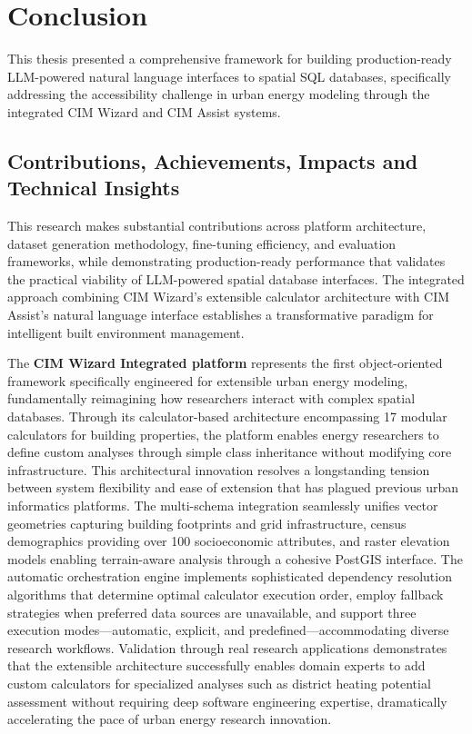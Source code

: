 \chapter{Conclusion}
\label{ch:conclusion}

This thesis presented a comprehensive framework for building production-ready LLM-powered natural language interfaces to spatial SQL databases, specifically addressing the accessibility challenge in urban energy modeling through the integrated CIM Wizard and CIM Assist systems.

\section{Contributions, Achievements, Impacts and Technical Insights}

This research makes substantial contributions across platform architecture, dataset generation methodology, fine-tuning efficiency, and evaluation frameworks, while demonstrating production-ready performance that validates the practical viability of LLM-powered spatial database interfaces. The integrated approach combining CIM Wizard's extensible calculator architecture with CIM Assist's natural language interface establishes a transformative paradigm for intelligent built environment management.

The \textbf{CIM Wizard Integrated platform} represents the first object-oriented framework specifically engineered for extensible urban energy modeling, fundamentally reimagining how researchers interact with complex spatial databases. Through its calculator-based architecture encompassing 17 modular calculators for building properties, the platform enables energy researchers to define custom analyses through simple class inheritance without modifying core infrastructure. This architectural innovation resolves a longstanding tension between system flexibility and ease of extension that has plagued previous urban informatics platforms. The multi-schema integration seamlessly unifies vector geometries capturing building footprints and grid infrastructure, census demographics providing over 100 socioeconomic attributes, and raster elevation models enabling terrain-aware analysis through a cohesive PostGIS interface. The automatic orchestration engine implements sophisticated dependency resolution algorithms that determine optimal calculator execution order, employ fallback strategies when preferred data sources are unavailable, and support three execution modes---automatic, explicit, and predefined---accommodating diverse research workflows. Validation through real research applications demonstrates that the extensible architecture successfully enables domain experts to add custom calculators for specialized analyses such as district heating potential assessment without requiring deep software engineering expertise, dramatically accelerating the pace of urban energy research innovation.

